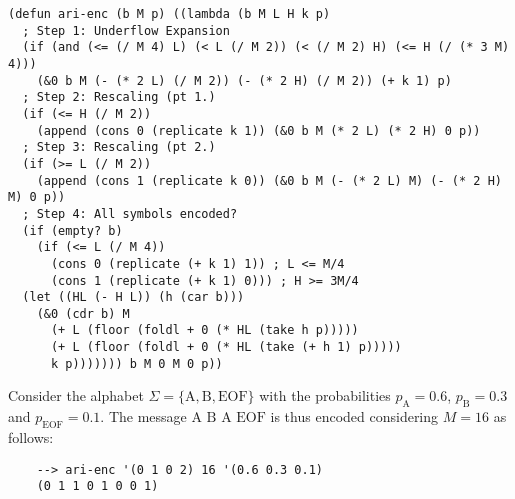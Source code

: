 \begin{Verbatim}
(defun ari-enc (b M p) ((lambda (b M L H k p)
  ; Step 1: Underflow Expansion
  (if (and (<= (/ M 4) L) (< L (/ M 2)) (< (/ M 2) H) (<= H (/ (* 3 M) 4)))
    (&0 b M (- (* 2 L) (/ M 2)) (- (* 2 H) (/ M 2)) (+ k 1) p)
  ; Step 2: Rescaling (pt 1.)
  (if (<= H (/ M 2))
    (append (cons 0 (replicate k 1)) (&0 b M (* 2 L) (* 2 H) 0 p))
  ; Step 3: Rescaling (pt 2.)
  (if (>= L (/ M 2))
    (append (cons 1 (replicate k 0)) (&0 b M (- (* 2 L) M) (- (* 2 H) M) 0 p))
  ; Step 4: All symbols encoded?
  (if (empty? b)
    (if (<= L (/ M 4))
      (cons 0 (replicate (+ k 1) 1)) ; L <= M/4
      (cons 1 (replicate (+ k 1) 0))) ; H >= 3M/4
  (let ((HL (- H L)) (h (car b)))
    (&0 (cdr b) M
      (+ L (floor (foldl + 0 (* HL (take h p)))))
      (+ L (floor (foldl + 0 (* HL (take (+ h 1) p)))))
      k p))))))) b M 0 M 0 p))
\end{Verbatim}

Consider the alphabet $\Sigma = \{\text{A}, \text{B}, \text{EOF}\}$ with the probabilities $p_\text{A} = 0.6$, $p_\text{B} = 0.3$ and $p_\text{EOF} = 0.1$. The message $\text{A B A EOF}$ is thus encoded considering $M = 16$ as follows:

\begin{Verbatim}
    --> ari-enc '(0 1 0 2) 16 '(0.6 0.3 0.1)
    (0 1 1 0 1 0 0 1)
\end{Verbatim}
